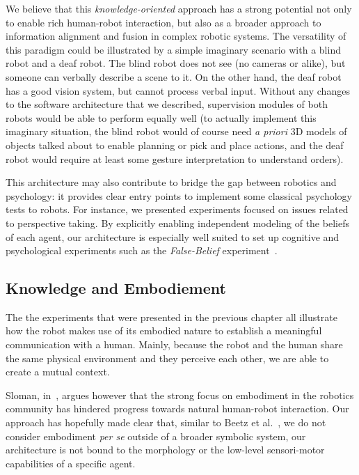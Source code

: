 We believe that this \emph{knowledge-oriented} approach has a strong potential
not only to enable rich human-robot interaction, but also as a broader approach
to information alignment and fusion in complex robotic systems.  The
versatility of this paradigm could be illustrated by a simple imaginary
scenario with a blind robot and a deaf robot. The blind robot does not see (no
cameras or alike), but someone can verbally describe a scene to it. On the
other hand, the deaf robot has a good vision system, but cannot process verbal
input.  Without any changes to the software architecture that we described,
supervision modules of both robots would be able to perform equally well (to
actually implement this imaginary situation, the blind robot would of course
need \textit{a priori} 3D models of objects talked about to enable planning or
pick and place actions, and the deaf robot would require at least some gesture
interpretation to understand orders).

This architecture may also contribute to bridge the gap between robotics and
psychology: it provides clear entry points to implement some classical
psychology tests to robots. For instance, we presented experiments focused on issues related
to perspective taking. By explicitly enabling independent modeling of the
beliefs of each agent, our architecture is especially well suited to set up
cognitive and psychological experiments such as the \emph{False-Belief}
experiment~\cite{Warnier2012a}.


\subsection{Knowledge and Embodiement}

The the experiments that were presented in the previous chapter all illustrate how the
robot makes use of its embodied nature to establish a meaningful communication
with a human. Mainly, because the robot and the human share the same physical
environment and they perceive each other, we are able to create a mutual
context.

Sloman, in~\cite{Sloman2009}, argues however that the strong focus on
embodiment in the robotics community has hindered progress towards natural
human-robot interaction. Our approach has hopefully made clear that, similar to
Beetz et al.~\cite{Beetz2010}, we do not consider embodiment \emph{per se}
outside of a broader symbolic system, \ie our architecture is not bound to the
morphology or the low-level sensori-motor capabilities of a specific agent. 

